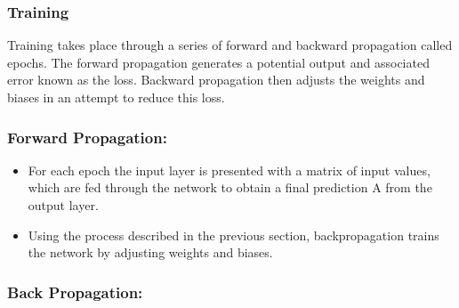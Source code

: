 \documentclass[./project-report/src/latex/project-report.tex]{subfiles}
\begin{document}
\subsubsection{Training}

Training takes place through a series of forward and backward propagation called epochs. The forward propagation generates a potential output and associated error known 
as the loss. Backward propagation then adjusts the weights and biases in an attempt to reduce this loss.

\subsubsection{Forward Propagation:}

\begin{itemize}
    \item For each epoch the input layer is presented with a matrix of input values, which are fed through the network to obtain a final prediction A from the output layer.
	\item Using the process described in the previous section, backpropagation trains the network by adjusting weights and biases.
\end{itemize}

\subsubsection{Back Propagation:}
\end{document}
